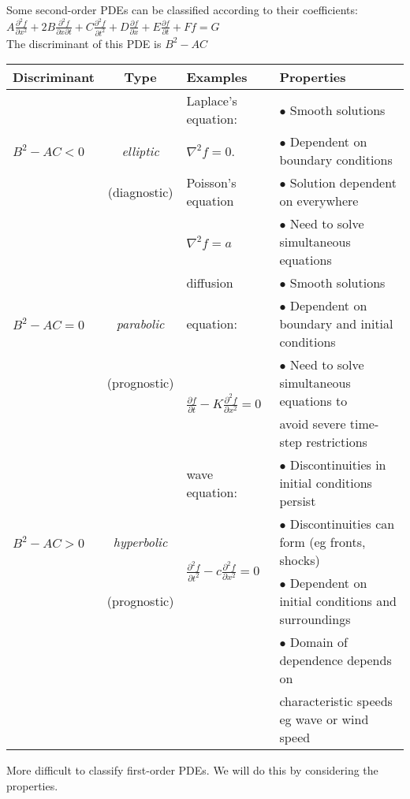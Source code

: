 Some second-order PDEs can be classified according to their coefficients:\\
{\centering$
A \frac{\partial^2 f}{\partial x^2}
+ 2B \frac{\partial^2 f}{\partial x \partial t}
+ C \frac{\partial^2 f}{\partial t^2}
+ D \frac{\partial f}{\partial x}
+ E \frac{\partial f}{\partial t}
+ Ff = G
$ \\ \vskip 4pt}
The discriminant of this PDE is $B^2 - AC$
\\ \vskip -6pt
{\setlength{\tabcolsep}{1pt}\renewcommand{\arraystretch}{1.1}
\begin{tabular}{l|c|l|l}
\bf Discriminant& \bf Type      & \bf Examples        & \bf Properties \\
\hline
               &                & Laplace's equation: & $\bullet$ Smooth solutions \\
$B^2 - AC < 0$ & {\em elliptic} & $\nabla^2 f = 0$.   & $\bullet$ Dependent on boundary conditions\\
               & (diagnostic)   & Poisson's equation  & $\bullet$ Solution dependent on everywhere \\
               &                & $\nabla^2 f = a$    & $\bullet$ Need to solve simultaneous equations\\
\hline
               &                & diffusion      & $\bullet$ Smooth solutions\\
$B^2 - AC = 0$ & {\em parabolic}& equation:           & $\bullet$ Dependent on boundary and initial conditions\\
               & (prognostic)   & \multirow{2}{*}{$\frac{\partial f}{\partial t} - K\frac{\partial^2f}{\partial x^2} = 0$} & 
                                                        $\bullet$ Need to solve simultaneous equations to \\
               &                &                     & \hphantom{$\bullet$} avoid severe time-step restrictions \\
\hline
               &                & wave equation:      & $\bullet$ Discontinuities in initial conditions persist\\
$B^2 - AC> 0$  & {\em hyperbolic}& \multirow{2}{*}{$\frac{\partial^2 f}{\partial t^2} - c\frac{\partial^2 f}{\partial x^2}=0$}
                                                      & $\bullet$ Discontinuities can form (eg fronts, shocks) \\
               & (prognostic)   &                     & $\bullet$ Dependent on initial conditions and surroundings\\
               &                &                     & $\bullet$ Domain of dependence depends on \\
               &                &                     & \hphantom{$\bullet$} characteristic speeds eg wave or wind speed \\
\end{tabular}
}
More difficult to classify first-order PDEs. We will do this by considering the properties.

